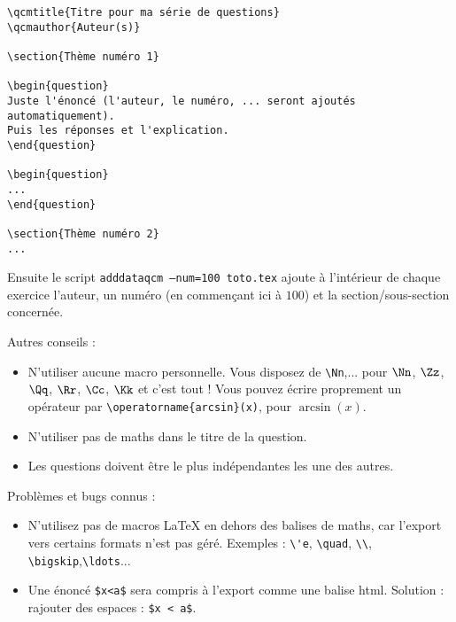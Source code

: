 \documentclass[12pt,a4paper]{article}
\begin{document}
\begin{center}
\begin{minipage}{0.8\textwidth}
\begin{verbatim}
\qcmtitle{Titre pour ma série de questions}
\qcmauthor{Auteur(s)}

\section{Thème numéro 1}

\begin{question}
Juste l'énoncé (l'auteur, le numéro, ... seront ajoutés automatiquement).
Puis les réponses et l'explication.
\end{question}

\begin{question}
...
\end{question}

\section{Thème numéro 2}
...

\end{verbatim}
\end{minipage}
\end{center}

Ensuite le script \texttt{adddataqcm --num=100 toto.tex} ajoute à l'intérieur de chaque exercice l'auteur, un numéro (en commençant ici à $100$) et la section/sous-section concernée.


\bigskip


Autres conseils :
\begin{itemize}
  \item N'utiliser aucune macro personnelle. Vous disposez de \verb|\Nn|,... pour $\Nn$, $\Zz$, $\Qq$, $\Rr$, $\Cc$, $\Kk$ et c'est tout ! Vous pouvez écrire proprement un opérateur par \verb|\operatorname{arcsin}(x)|, pour $\operatorname{arcsin}(x)$.
  
  \item N'utiliser pas de maths dans le titre de la question.
  
  \item Les questions doivent être le plus indépendantes les une des autres.
  

  
\end{itemize}

Problèmes et bugs connus :
\begin{itemize}
  \item N'utilisez pas de macros \LaTeX{} en dehors des balises de maths, car l'export vers certains formats n'est pas géré. Exemples : \verb|\'e|, \verb|\quad|, \verb|\\|, \verb|\bigskip|,\verb|\ldots|...
  \item Une énoncé \verb|$x<a$| sera compris à l'export comme une balise html. Solution : rajouter des espaces : \verb|$x < a$|.
 \end{itemize} 
\end{document}
